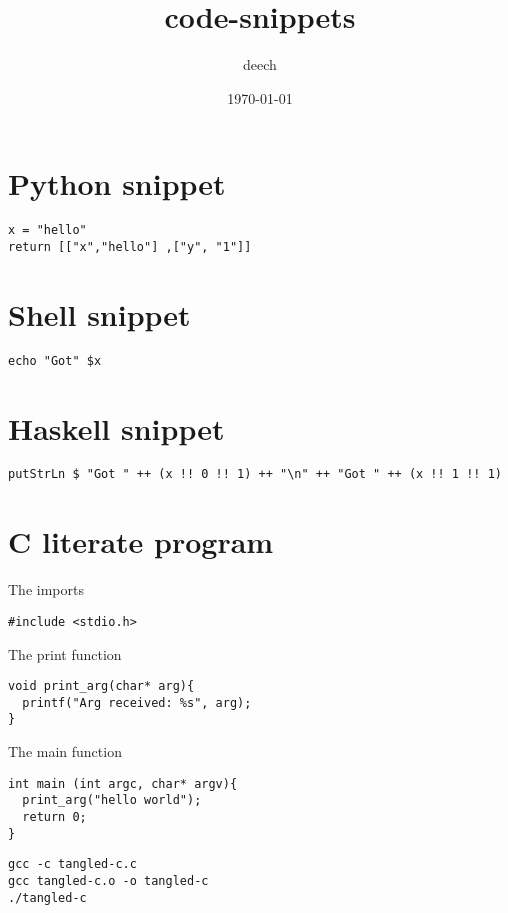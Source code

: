 \documentclass[11pt]{article}
\title{code-snippets}
\author{deech}
\date{\today}
\begin{document}
\maketitle

\setcounter{tocdepth}{3}
\tableofcontents
\vspace*{1cm}
\section{Python snippet}
\label{sec-1}


\begin{verbatim}
x = "hello"
return [["x","hello"] ,["y", "1"]]
\end{verbatim}
\section{Shell snippet}
\label{sec-2}


\begin{verbatim}
echo "Got" $x
\end{verbatim}
\section{Haskell snippet}
\label{sec-3}


\begin{verbatim}
putStrLn $ "Got " ++ (x !! 0 !! 1) ++ "\n" ++ "Got " ++ (x !! 1 !! 1)
\end{verbatim}
\section{C literate program}
\label{sec-4}

  The imports

\begin{verbatim}
#include <stdio.h>
\end{verbatim}

  The print function

\begin{verbatim}
void print_arg(char* arg){
  printf("Arg received: %s", arg);
}
\end{verbatim}

  The main function

\begin{verbatim}
int main (int argc, char* argv){
  print_arg("hello world");
  return 0;
}
\end{verbatim}


\begin{verbatim}
gcc -c tangled-c.c
gcc tangled-c.o -o tangled-c
./tangled-c
\end{verbatim}


  
\end{document}
